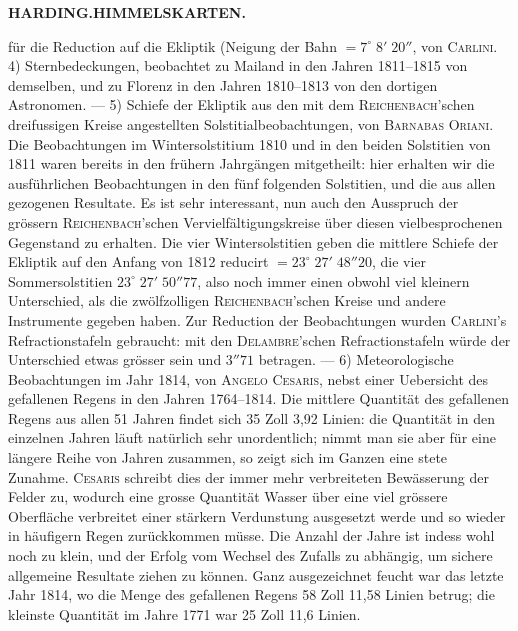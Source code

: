 \clearpage
\thispagestyle{empty}
\noindent{}%
\makebox[12mm][l]{}%
\parbox[t]{\dimexpr\linewidth-24mm\relax}{\centering\footnotesize\bfseries HARDING.\enspace HIMMELSKARTEN.\par}%
\par\medskip
\noindent für die Reduction auf die Ekliptik (Neigung der Bahn $=7^\circ\;8'\;20''$, von \textsc{Carlini}. 4) Sternbedeckungen, beobachtet zu Mailand in den Jahren 1811--1815 von demselben, und zu Florenz in den Jahren 1810--1813 von den dortigen Astronomen. --- 5) Schiefe der Ekliptik aus den mit dem \textsc{Reichenbach}'schen dreifussigen Kreise angestellten Solstitialbeobachtungen, von \textsc{Barnabas Oriani}. Die Beobachtungen im Wintersolstitium 1810 und in den beiden Solstitien von 1811 waren bereits in den frühern Jahrgängen mitgetheilt: hier erhalten wir die ausführlichen Beobachtungen in den fünf folgenden Solstitien, und die aus allen gezogenen Resultate. Es ist sehr interessant, nun auch den Ausspruch der grössern \textsc{Reichenbach}'schen Vervielfältigungskreise über diesen vielbesprochenen Gegenstand zu erhalten. Die vier Wintersolstitien geben die mittlere Schiefe der Ekliptik auf den Anfang von 1812 reducirt $=23^\circ\;27'\;48''20$, die vier Sommersolstitien $23^\circ\;27'\;50''77$, also noch immer einen obwohl viel kleinern Unterschied, als die zwölfzolligen \textsc{Reichenbach}'schen Kreise und andere Instrumente gegeben haben. Zur Reduction der Beobachtungen wurden \textsc{Carlini}'s Refractionstafeln gebraucht: mit den \textsc{Delambre}'schen Refractionstafeln würde der Unterschied etwas grösser sein und $3''71$ betragen. --- 6) Meteorologische Beobachtungen im Jahr 1814, von \textsc{Angelo Cesaris}, nebst einer Uebersicht des gefallenen Regens in den Jahren 1764--1814. Die mittlere Quantität des gefallenen Regens aus allen 51 Jahren findet sich 35 Zoll 3,92 Linien: die Quantität in den einzelnen Jahren läuft natürlich sehr unordentlich; nimmt man sie aber für eine längere Reihe von Jahren zusammen, so zeigt sich im Ganzen eine stete Zunahme. \textsc{Cesaris} schreibt dies der immer mehr verbreiteten Bewässerung der Felder zu, wodurch eine grosse Quantität Wasser über eine viel grössere Oberfläche verbreitet einer stärkern Verdunstung ausgesetzt werde und so wieder in häufigern Regen zurückkommen müsse. Die Anzahl der Jahre ist indess wohl noch zu klein, und der Erfolg vom Wechsel des Zufalls zu abhängig, um sichere allgemeine Resultate ziehen zu können. Ganz ausgezeichnet feucht war das letzte Jahr 1814, wo die Menge des gefallenen Regens 58 Zoll 11,58 Linien betrug; die kleinste Quantität im Jahre 1771 war 25 Zoll 11,6 Linien.
